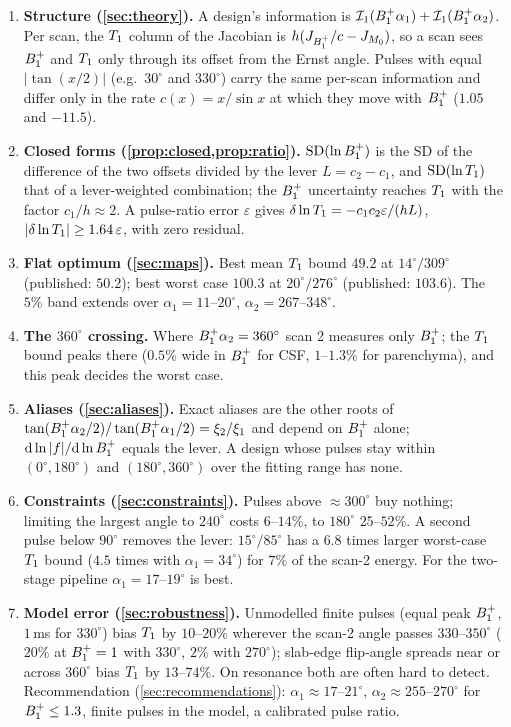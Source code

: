 \begin{enumerate}
\item \textbf{Structure (\cref{sec:theory}).} A design's information is $\mathcal{I}_1(B_1^{+}\alpha_1)+\mathcal{I}_1(B_1^{+}\alpha_2)$. Per
  scan, the $T_1$ column of the Jacobian is $h(J_{B_1^{+}}/c-J_{M_0})$, so a scan sees $B_1^{+}$ and $T_1$ only through
  its offset from the Ernst angle. Pulses with equal $|\tan(x/2)|$ (e.g.\ $30^\circ$ and $330^\circ$) carry the same
  per-scan information and differ only in the rate $c(x)=x/\sin x$ at which they move with $B_1^{+}$ ($1.05$
  and $-11.5$).
\item \textbf{Closed forms (\cref{prop:closed,prop:ratio}).} $\mathrm{SD}(\ln B_1^{+})$ is the SD of the difference of
  the two offsets divided by the lever $L=c_2-c_1$, and $\mathrm{SD}(\ln T_1)$ that of a lever-weighted
  combination; the $B_1^{+}$ uncertainty reaches $T_1$ with the factor $c_1/h\approx2$. A pulse-ratio error $\varepsilon$ gives
  $\delta\ln T_1=-c_1c_2\varepsilon/(hL)$, $|\delta\ln T_1|\ge1.64\,\varepsilon$, with zero residual.
\item \textbf{Flat optimum (\cref{sec:maps}).} Best mean $T_1$ bound $49.2$ at $14^\circ/309^\circ$ (published: $50.2$);
  best worst case $100.3$ at $20^\circ/276^\circ$ (published: $103.6$). The $5\%$ band extends over $\alpha_1=11$--$20^\circ$,
  $\alpha_2=267$--$348^\circ$.
\item \textbf{The $360^\circ$ crossing.} Where $B_1^{+}\alpha_2=360^\circ$ scan 2 measures only $B_1^{+}$; the $T_1$ bound peaks there
  ($0.5\%$ wide in $B_1^{+}$ for CSF, $1$--$1.3\%$ for parenchyma), and this peak decides the worst case.
\item \textbf{Aliases (\cref{sec:aliases}).} Exact aliases are the other roots of
  $\tan(B_1^{+}\alpha_2/2)/\tan(B_1^{+}\alpha_1/2)=\xi_2/\xi_1$ and depend on $B_1^{+}$ alone; $\mathrm d\ln|f|/\mathrm d\ln B_1^{+}$ equals the lever. A
  design whose pulses stay within $(0^\circ,180^\circ)$ and $(180^\circ,360^\circ)$ over the fitting range has none.
\item \textbf{Constraints (\cref{sec:constraints}).} Pulses above $\approx300^\circ$ buy nothing; limiting the largest
  angle to $240^\circ$ costs $6$--$14\%$, to $180^\circ$ $25$--$52\%$. A second pulse below $90^\circ$ removes the lever: $15^\circ/85^\circ$ has a $6.8$ times
  larger worst-case $T_1$ bound ($4.5$ times with $\alpha_1=34^\circ$) for $7\%$ of the scan-2 energy. For the two-stage pipeline $\alpha_1=17$--$19^\circ$ is best.
\item \textbf{Model error (\cref{sec:robustness}).} Unmodelled finite pulses (equal peak $B_1^{+}$, $1$\,ms for $330^\circ$)
  bias $T_1$ by $10$--$20\%$ wherever the scan-2 angle passes $330$--$350^\circ$ ($20\%$ at $B_1^{+}=1$ with $330^\circ$, $2\%$ with
  $270^\circ$); slab-edge flip-angle spreads near or across $360^\circ$ bias $T_1$ by $13$--$74\%$. On resonance both are
  often hard to detect. Recommendation (\cref{sec:recommendations}): $\alpha_1\approx17$--$21^\circ$,
  $\alpha_2\approx255$--$270^\circ$ for $B_1^{+}\le1.3$, finite pulses in the model, a calibrated pulse ratio.
\end{enumerate}
